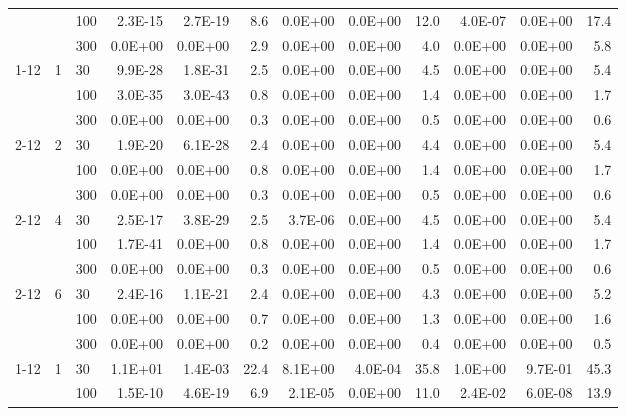 \documentclass[conference]{IEEEtran}
\begin{document}
\begin{table}[!t]
\begin{tabular}{|l|l|l|rrr|rrr|rrr|}
      & & 100  & 2.3E-15 & 2.7E-19 & 8.6 & 0.0E+00 & 0.0E+00 & 12.0 & 4.0E-07 & 0.0E+00 & 17.4\\
      & & 300  & 0.0E+00 & 0.0E+00 & 2.9 & 0.0E+00 & 0.0E+00 & 4.0 & 0.0E+00 & 0.0E+00 & 5.8\\
      \cline{1-12}
      \multirow{12}{*}{\begin{turn}{90}MTGP32\end{turn}} & \multirow{3}{*}{1} & 30  & 9.9E-28 & 1.8E-31 & 2.5 & 0.0E+00 & 0.0E+00 & 4.5 & 0.0E+00 & 0.0E+00 & 5.4\\
      & & 100  & 3.0E-35 & 3.0E-43 & 0.8 & 0.0E+00 & 0.0E+00 & 1.4 & 0.0E+00 & 0.0E+00 & 1.7\\
      & & 300  & 0.0E+00 & 0.0E+00 & 0.3 & 0.0E+00 & 0.0E+00 & 0.5 & 0.0E+00 & 0.0E+00 & 0.6\\
      \cline{2-12}
      & \multirow{3}{*}{2} & 30  & 1.9E-20 & 6.1E-28 & 2.4 & 0.0E+00 & 0.0E+00 & 4.4 & 0.0E+00 & 0.0E+00 & 5.4\\
      & & 100  & 0.0E+00 & 0.0E+00 & 0.8 & 0.0E+00 & 0.0E+00 & 1.4 & 0.0E+00 & 0.0E+00 & 1.7\\
      & & 300  & 0.0E+00 & 0.0E+00 & 0.3 & 0.0E+00 & 0.0E+00 & 0.5 & 0.0E+00 & 0.0E+00 & 0.6\\
      \cline{2-12}
      & \multirow{3}{*}{4} & 30  & 2.5E-17 & 3.8E-29 & 2.5 & 3.7E-06 & 0.0E+00 & 4.5 & 0.0E+00 & 0.0E+00 & 5.4\\
      & & 100  & 1.7E-41 & 0.0E+00 & 0.8 & 0.0E+00 & 0.0E+00 & 1.4 & 0.0E+00 & 0.0E+00 & 1.7\\
      & & 300  & 0.0E+00 & 0.0E+00 & 0.3 & 0.0E+00 & 0.0E+00 & 0.5 & 0.0E+00 & 0.0E+00 & 0.6\\
      \cline{2-12}
      & \multirow{3}{*}{6} & 30  & 2.4E-16 & 1.1E-21 & 2.4 & 0.0E+00 & 0.0E+00 & 4.3 & 0.0E+00 & 0.0E+00 & 5.2\\
      & & 100  & 0.0E+00 & 0.0E+00 & 0.7 & 0.0E+00 & 0.0E+00 & 1.3 & 0.0E+00 & 0.0E+00 & 1.6\\
      & & 300  & 0.0E+00 & 0.0E+00 & 0.2 & 0.0E+00 & 0.0E+00 & 0.4 & 0.0E+00 & 0.0E+00 & 0.5\\
      \cline{1-12}
      \multirow{12}{*}{\begin{turn}{90}\foobar[language=C]{Philox_4x32_10}\end{turn}} & \multirow{3}{*}{1} & 30  & 1.1E+01 & 1.4E-03 & 22.4 & 8.1E+00 & 4.0E-04 & 35.8 & 1.0E+00 & 9.7E-01 & 45.3\\
      & & 100  & 1.5E-10 & 4.6E-19 & 6.9 & 2.1E-05 & 0.0E+00 & 11.0 & 2.4E-02 & 6.0E-08 & 13.9\\

\end{tabular}
\end{table}
\end{document}
